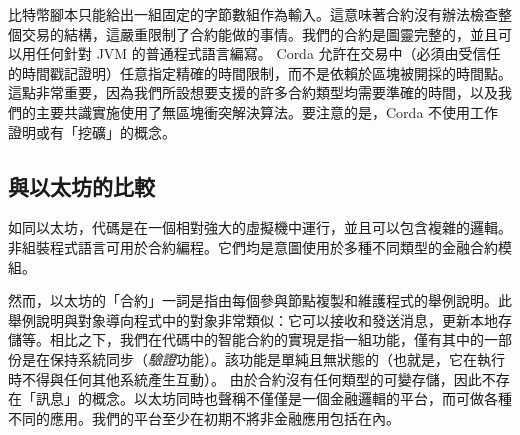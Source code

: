 ﻿\documentclass{article}
\begin{document}
比特幣腳本只能給出一組固定的字節數組作為輸入。這意味著合約沒有辦法檢查整個交易的結構，這嚴重限制了合約能做的事情。我們的合約是圖靈完整的，並且可以用任何針對 JVM 的普通程式語言編寫。	
Corda 允許在交易中（必須由受信任的時間戳記證明）任意指定精確的時間限制，而不是依賴於區塊被開採的時間點。這點非常重要，因為我們所設想要支援的許多合約類型均需要準確的時間，以及我們的主要共識實施使用了無區塊衝突解決算法。要注意的是，Corda 不使用工作證明或有「挖礦」的概念。

\subsection{與以太坊的比較}
如同以太坊，代碼是在一個相對強大的虛擬機中運行，並且可以包含複雜的邏輯。非組裝程式語言可用於合約編程。它們均是意圖使用於多種不同類型的金融合約模組。

然而，以太坊的「合約」一詞是指由每個參與節點複製和維護程式的舉例說明。此舉例說明與對象導向程式中的對象非常類似：它可以接收和發送消息，更新本地存儲等。相比之下，我們在代碼中的智能合約的實現是指一組功能，僅有其中的一部份是在保持系統同步（\textit{驗證}功能）。該功能是單純且無狀態的（也就是，它在執行時不得與任何其他系統產生互動）。	由於合約沒有任何類型的可變存儲，因此不存在「訊息」的概念。以太坊同時也聲稱不僅僅是一個金融邏輯的平台，而可做各種不同的應用。我們的平台至少在初期不將非金融應用包括在內。



\end{document}
